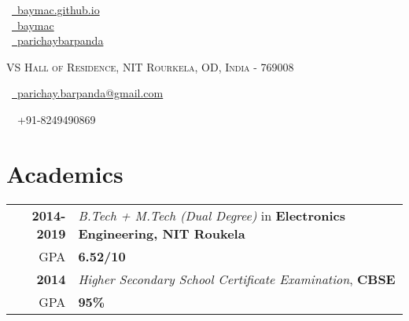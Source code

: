 \documentclass[a4paper,10pt]{extarticle} %
\begin{document}
\pagestyle{empty} %


\begin{multicols}{3}
\normalsize  \faGlobe\ {\href{https://baymac.github.io/}{\  baymac.github.io}}\\
\normalsize \faGithub\ {\href{https://github.com/baymac}{\  baymac}}\\
\normalsize  \faLinkedinSquare\ {\href{https://www.linkedin.com/in/parichaybarpanda/}{\  parichaybarpanda}}\\
\columnbreak
\normalsize\par{\centering{\huge\textsc{\textcolor{primary}{Parichay Barpanda}}}\par} %
\par{\centering\normalsize {\textsc{VS Hall of Residence, NIT Rourkela, OD, India - 769008}}\hfill\par}
\columnbreak
\raggedright\hfill\normalsize \faEnvelope\ {\href{mailto:parichay.barpanda@gmail.com}{\  parichay.barpanda@gmail.com}}\\
\raggedright\hfill{\faPhone\ \  +91-8249490869}
\end{multicols}


\vspace{-0.6cm}
\section{\textcolor{primary}{Academics}}

\begin{tabular}{r|p{17.5cm}}	
\textbf{2014-2019} & \textit{B.Tech + M.Tech (Dual Degree)} in \textbf{Electronics Engineering, NIT Roukela}\\
\hfill GPA & \textbf{6.52/10}\\
\textbf{2014} & \textit{Higher Secondary School Certificate Examination}, \textbf{CBSE}\\
\hfill GPA & \textbf{95\%}\\
\end{tabular}
\end{document}

